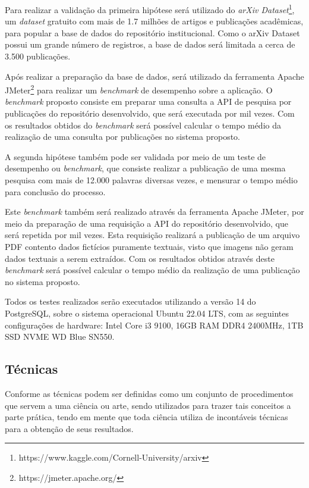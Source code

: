 Para realizar a validação da primeira hipótese será utilizado do
\emph{arXiv Dataset}\footnote{https://www.kaggle.com/Cornell-University/arxiv},
um \emph{dataset} gratuito com mais de 1.7 milhões de artigos e publicações acadêmicas,
para popular a base de dados do repositório institucional. Como o arXiv Dataset
possui um grande número de registros, a base de dados será limitada
a cerca de 3.500 publicações.

Após realizar a preparação da base de dados, será utilizado da ferramenta
Apache JMeter\footnote{https://jmeter.apache.org/} para realizar um \emph{benchmark}
de desempenho sobre a aplicação. O \emph{benchmark} proposto consiste em preparar
uma consulta a API de pesquisa por publicações do repositório desenvolvido, que será
executada por mil vezes. Com os resultados obtidos do \emph{benchmark} será possível
calcular o tempo médio da realização de uma consulta por publicações no sistema proposto.

A segunda hipótese também pode ser validada por meio de um teste de desempenho
ou \emph{benchmark}, que consiste realizar a publicação de uma mesma pesquisa
com mais de 12.000 palavras diversas vezes, e mensurar o tempo médio para conclusão
do processo.

Este \emph{benchmark} também será realizado através da ferramenta Apache JMeter,
por meio da preparação de uma requisição a API do repositório desenvolvido, que será
repetida por mil vezes. Esta requisição realizará a publicação de um arquivo PDF contento dados
fictícios puramente textuais, visto que imagens não geram dados textuais a serem extraídos.
Com os resultados obtidos através deste \emph{benchmark} será possível calcular o tempo médio
da realização de uma publicação no sistema proposto.

Todos os testes realizados serão executados utilizando
a versão 14 do PostgreSQL, sobre o sistema operacional Ubuntu 22.04 LTS,
com as seguintes configurações de hardware: Intel Core i3 9100, 16GB RAM DDR4 2400MHz,
1TB SSD NVME WD Blue SN550.

\subsection{Técnicas}

Conforme \citep[p. 174]{LAKATOS2003:metodologia} as técnicas podem
ser definidas como um conjunto de procedimentos que servem a
uma ciência ou arte, sendo utilizados para trazer tais
conceitos a parte prática, tendo em mente que toda ciência utiliza
de incontáveis técnicas para a obtenção de seus resultados.

